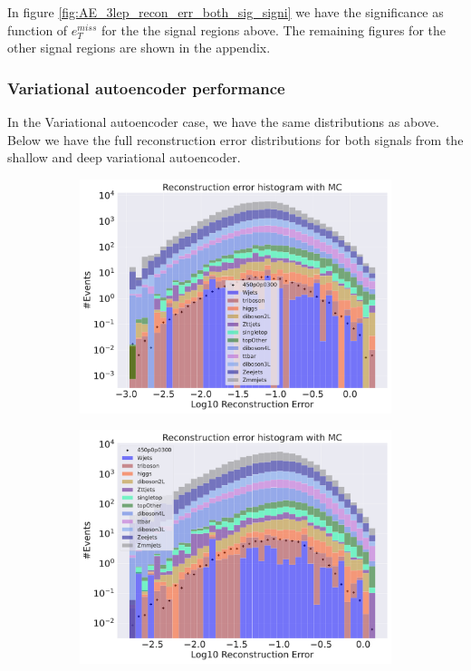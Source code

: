In figure \ref{fig:AE_3lep_recon_err_both_sig_signi} we have the significance as function of $e_T^{miss}$
for the the signal regions above. The remaining figures for the other signal regions are shown in the appendix. 
\par 

\subsubsection*{Variational autoencoder performance}
In the Variational autoencoder case, we have the same distributions as above. Below we have the full reconstruction 
error distributions for both signals from the shallow and deep variational autoencoder. 


\begin{figure}[H]
    \centering
    \begin{subfigure}{.45\textwidth}
        \includegraphics[width=\textwidth]{Figures/VAE_testing/big/3lep/b_data_recon_big_rm3_feats_sig_450p0p0300.pdf}
        \caption{ }
        \label{fig:VAE_3lep_big_450}
    \end{subfigure}
    \hfill
    \begin{subfigure}{.45\textwidth}
        \includegraphics[width=\textwidth]{Figures/VAE_testing/small/3lep/b_data_recon_big_rm3_feats_sig_450p0p0300.pdf}

\end{subfigure}
\end{figure}
